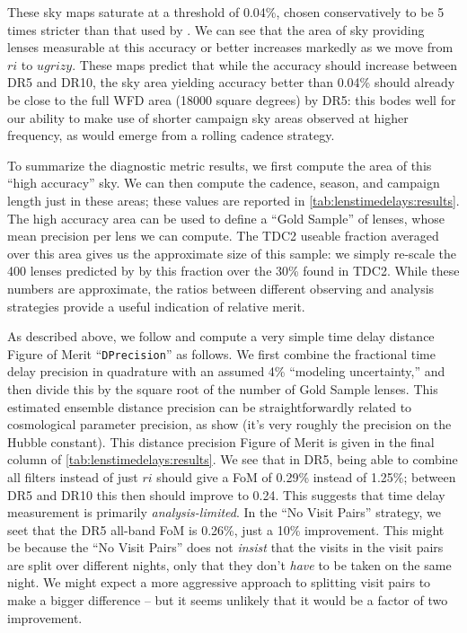 These sky maps saturate at a threshold of 0.04\%, chosen conservatively
to be 5 times stricter than that used by
\citeauthor{Hojjati+Linder2014}. We can see that the area of sky
providing lenses measurable at this accuracy or better increases
markedly as we move from $ri$ to $ugrizy$. These maps predict that while
the accuracy should increase between DR5 and DR10, the sky area yielding
accuracy better than 0.04\% should already be close to the full WFD area
(18000 square degrees) by DR5: this bodes well for our ability to make
use of shorter campaign sky areas observed at higher frequency, as would
emerge from a rolling cadence strategy.

To summarize the diagnostic metric results, we first compute the area of
this ``high accuracy'' sky. We can then compute the cadence, season, and
campaign length just in these areas; these values are reported in
\autoref{tab:lenstimedelays:results}. The high accuracy area can be used
to define a ``Gold Sample'' of lenses, whose mean precision per lens we
can compute. The TDC2 useable fraction averaged over this area gives us
the approximate size of this sample: we simply re-scale the 400 lenses
predicted by \citet{LiaoEtal2015} by this fraction over the 30\% found
in TDC2. While these numbers are approximate, the ratios between
different observing and analysis strategies provide a useful indication of relative merit.

As described above, we follow \citet{Coe+Moustakas2009} and compute a
very simple time delay distance Figure of Merit ``\texttt{DPrecision}''
as follows. We first combine the fractional time delay precision in
quadrature with an assumed 4\% ``modeling uncertainty,'' and then divide
this by the square root of the number of Gold Sample lenses. This
estimated ensemble distance precision can be straightforwardly related
to cosmological parameter precision, as \citet{Coe+Moustakas2009} show
(it's very roughly the precision on the Hubble constant).  This distance
precision Figure of Merit is given in the final column of
\autoref{tab:lenstimedelays:results}. We see that in DR5, being able to
combine all filters instead of just $ri$ should give a FoM of 0.29\%
instead of 1.25\%; between DR5 and DR10 this then should improve to
0.24. This suggests that time delay measurement is primarily {\it
analysis-limited}. In the ``No Visit Pairs'' strategy, we seet that the
DR5 all-band FoM is 0.26\%, just a 10\% improvement. This might be
because the ``No Visit Pairs'' does not {\it insist} that the visits in
the visit pairs are split over different nights, only that they don't
{\it have} to be taken on the same night. We might expect a more
aggressive approach to splitting visit pairs to make a bigger difference --
but it seems unlikely that it would be a factor of two improvement.

